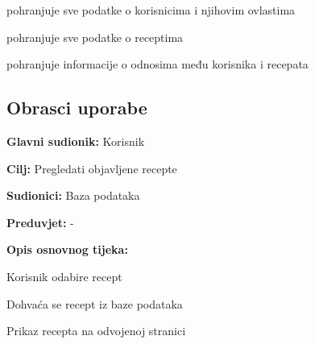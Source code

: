 \begin{packed_enum}
\begin{packed_enum}
				\end{packed_enum}
			
				\item  {}
				
				\begin{packed_enum}
					
					\item pohranjuje sve podatke o korisnicima i njihovim ovlastima
					\item pohranjuje sve podatke o receptima
					\item pohranjuje informacije o odnosima među korisnika i recepata
					
				\end{packed_enum}
			\end{packed_enum}
			
			\eject 
			
			
				
			\subsection{Obrasci uporabe}
					
					\noindent {}
					\begin{packed_item}
						
						\item \textbf{Glavni sudionik: }Korisnik
						\item \textbf{Cilj: }Pregledati objavljene recepte
						\item \textbf{Sudionici: }Baza podataka
						\item \textbf{Preduvjet: }-
						\item \textbf{Opis osnovnog tijeka:}
						
						\item[] \begin{packed_enum}
								\item Korisnik odabire recept
								\item Dohvaća se recept iz baze podataka
								\item Prikaz recepta na odvojenoj stranici
								\end{packed_enum}
					\end{packed_item}
					
